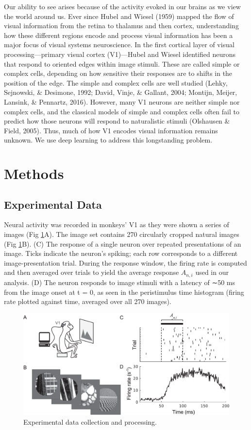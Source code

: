 \documentclass{templates/ucdenverthesis}
\begin{document}
Our ability to see arises because of the activity evoked in our brains as we view the world around us. Ever since Hubel and Wiesel (1959) mapped the flow of visual information from the retina to thalamus and then cortex, understanding how these different regions encode and process visual information has been a major focus of visual systems neuroscience. In the first cortical layer of visual processing---primary visual cortex (V1)---Hubel and Wiesel identified neurons that respond to oriented edges within image stimuli. These are called simple or complex cells, depending on how sensitive their responses are to shifts in the position of the edge. The simple and complex cells are well studied (Lehky, Sejnowski, \& Desimone, 1992; David, Vinje, \& Gallant, 2004; Montijn, Meijer, Lansink, \& Pennartz, 2016). However, many V1 neurons are neither simple nor complex cells, and the classical models of simple and complex cells often fail to predict how those neurons will respond to naturalistic stimuli (Olshausen \& Field, 2005). Thus, much of how V1 encodes visual information remains unknown. We use deep learning to address this longstanding problem.

\hypertarget{methods}{%
\section{Methods}\label{methods}}

\hypertarget{experimental-data}{%
\subsection{Experimental Data}\label{experimental-data}}

Neural activity was recorded in monkeys' V1 as they were shown a series of images (Fig \ref{fig:5-1}A). The image set contains 270 circularly cropped natural images (Fig \ref{fig:5-1}B). (C) The response of a single neuron over repeated presentations of an image. Ticks indicate the neuron's spiking; each row corresponds to a different image-presentation trial. During the response window, the firing rate is computed and then averaged over trials to yield the average response \(A_{n,i}\) used in our analysis. (D) The neuron responds to image stimuli with a latency of ∼50 ms from the image onset at t = 0, as seen in the peristimulus time histogram (firing rate plotted against time, averaged over all 270 images).

\begin{figure}

{\centering \includegraphics[width=0.75\linewidth]{img/figure_5.1} 

}

\caption{Experimental data collection and processing.}\label{fig:5-1}
\end{figure}

\printbibliography[heading=bibintoc]
\end{document}
